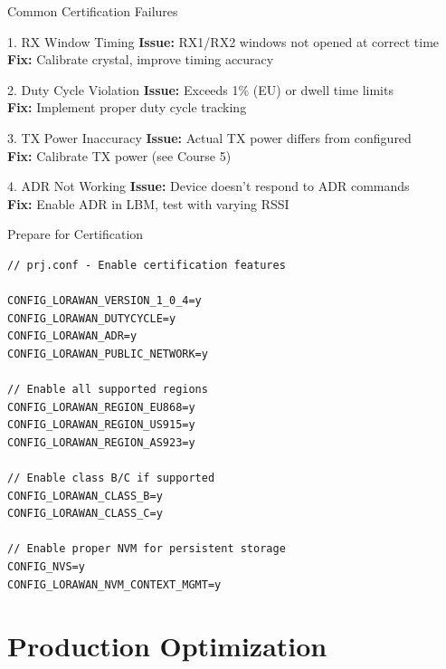 \documentclass{beamer}
\begin{document}
\begin{frame}{Common Certification Failures}
\begin{block}{1. RX Window Timing}
\textbf{Issue:} RX1/RX2 windows not opened at correct time\\
\textbf{Fix:} Calibrate crystal, improve timing accuracy
\end{block}

\begin{block}{2. Duty Cycle Violation}
\textbf{Issue:} Exceeds 1\% (EU) or dwell time limits\\
\textbf{Fix:} Implement proper duty cycle tracking
\end{block}

\begin{block}{3. TX Power Inaccuracy}
\textbf{Issue:} Actual TX power differs from configured\\
\textbf{Fix:} Calibrate TX power (see Course 5)
\end{block}

\begin{block}{4. ADR Not Working}
\textbf{Issue:} Device doesn't respond to ADR commands\\
\textbf{Fix:} Enable ADR in LBM, test with varying RSSI
\end{block}
\end{frame}

\begin{frame}[fragile]{Prepare for Certification}
\begin{lstlisting}[caption={Enable All LoRaWAN Features}]
// prj.conf - Enable certification features

CONFIG_LORAWAN_VERSION_1_0_4=y
CONFIG_LORAWAN_DUTYCYCLE=y
CONFIG_LORAWAN_ADR=y
CONFIG_LORAWAN_PUBLIC_NETWORK=y

// Enable all supported regions
CONFIG_LORAWAN_REGION_EU868=y
CONFIG_LORAWAN_REGION_US915=y
CONFIG_LORAWAN_REGION_AS923=y

// Enable class B/C if supported
CONFIG_LORAWAN_CLASS_B=y
CONFIG_LORAWAN_CLASS_C=y

// Enable proper NVM for persistent storage
CONFIG_NVS=y
CONFIG_LORAWAN_NVM_CONTEXT_MGMT=y
\end{lstlisting}
\end{frame}

\section{Production Optimization}
\end{document}
